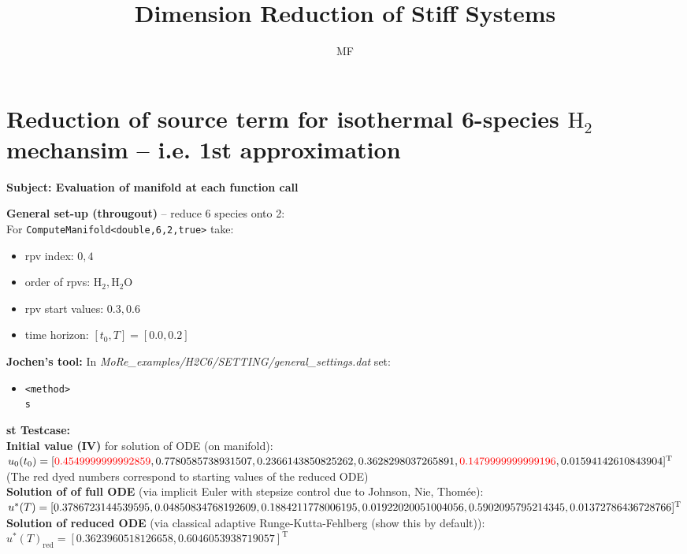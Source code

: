 \documentclass[11pt,a4paper]{article}
\title{Dimension Reduction of Stiff Systems}
\author{MF}
\newcommand{\trans}{^{\operatorname{T}}}
\newcommand{\dyeitred}{\textcolor{red}}{}
\newcommand{\water}{\operatorname{H_2O}}
\newcommand{\hydrogen}{\operatorname{H_2}}
\begin{document}
\setlength{\parindent}{0pt}

\maketitle

\section{Reduction of source term for isothermal 6-species $\hydrogen$ mechansim -- i.e. 1st approximation}

\textbf{\textsf{Subject: Evaluation of manifold at each function call}}

\bigskip
\textbf{\textsf{General set-up (througout)}} -- reduce 6 species onto 2:  \\
For \texttt{ComputeManifold<double,6,2,true>} take:
\begin{itemize}
  \item rpv index: $0, 4$
  \item order of rpvs: $\hydrogen, \water$
  \item rpv start values: $0.3, 0.6$ 
  \item time horizon: $[t_0,T] = [0.0, 0.2]$
\end{itemize}

\textbf{\textsf{Jochen's tool:}} In \textit{MoRe\_examples/H2C6/SETTING/general\_settings.dat} set:
\begin{itemize}
  \item \texttt{<method> \\ s}
\end{itemize}

\textbf{st Testcase:}\\
\textbf{\textsf{Initial value (IV)}} for solution of ODE (on manifold):\\
 $ u_0(t_0) = [\dyeitred{0.4549999999992859}, 0.7780585738931507, 0.2366143850825262, \\ 0.3628298037265891, \dyeitred{0.1479999999999196}, 0.01594142610843904]\trans$ \\
(The red dyed numbers correspond to starting values of the reduced ODE)\\
\textbf{\textsf{Solution of of full ODE}} (via implicit Euler with stepsize control due to Johnson, Nie, Thom\'ee):\\
$u^*(T) = [0.3786723144539595, 0.04850834768192609, 0.1884211778006195, \\0.01922020051004056, 0.5902095795214345, 0.01372786436728766 ]\trans$\\
\textbf{\textsf{Solution of reduced ODE}} (via classical adaptive Runge-Kutta-Fehlberg (show this by default)):\\
$u^*(T)_{\mathrm{red}} = [ 0.3623960518126658, 0.6046053938719057 ]\trans$
\end{document}
